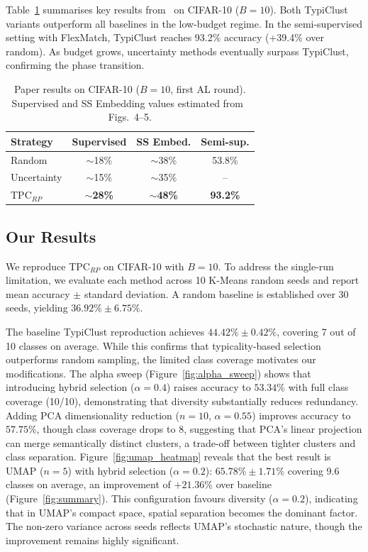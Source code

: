 \documentclass[10pt, twocolumn]{article}
\begin{document}
Table~\ref{tab:paper} summarises key results from~\cite{hacohen2022active} on CIFAR-10 ($B=10$). Both TypiClust variants outperform all baselines in the low-budget regime. In the semi-supervised setting with FlexMatch, TypiClust reaches 93.2\% accuracy (+39.4\% over random). As budget grows, uncertainty methods eventually surpass TypiClust, confirming the phase transition.

\begin{table}[h!]
    \centering\small
    \begin{tabular}{lccc}
        \toprule
        Strategy & Supervised & SS Embed. & Semi-sup. \\
        \midrule
        Random     & $\sim$18\% & $\sim$38\% & 53.8\% \\
        Uncertainty & $\sim$15\% & $\sim$35\% & -- \\
        TPC$_{RP}$ & $\sim$\textbf{28\%} & $\sim$\textbf{48\%} & \textbf{93.2\%} \\
        \bottomrule
    \end{tabular}
    \caption{Paper results on CIFAR-10 ($B=10$, first AL round). Supervised and SS Embedding values estimated from~\cite{hacohen2022active} Figs.\ 4--5.}
    \label{tab:paper}
\end{table}

\subsection{Our Results}

We reproduce TPC$_{RP}$ on CIFAR-10 with $B = 10$. To address the single-run limitation, we evaluate each method across 10 K-Means random seeds and report mean accuracy $\pm$ standard deviation. A random baseline is established over 30 seeds, yielding $36.92\% \pm 6.75\%$.

The baseline TypiClust reproduction achieves $44.42\% \pm 0.42\%$, covering 7 out of 10 classes on average. While this confirms that typicality-based selection outperforms random sampling, the limited class coverage motivates our modifications. The alpha sweep (Figure~\ref{fig:alpha_sweep}) shows that introducing hybrid selection ($\alpha = 0.4$) raises accuracy to $53.34\%$ with full class coverage (10/10), demonstrating that diversity substantially reduces redundancy. Adding PCA dimensionality reduction ($n = 10$, $\alpha = 0.55$) improves accuracy to $57.75\%$, though class coverage drops to 8, suggesting that PCA's linear projection can merge semantically distinct clusters, a trade-off between tighter clusters and class separation. Figure~\ref{fig:umap_heatmap} reveals that the best result is UMAP ($n = 5$) with hybrid selection ($\alpha = 0.2$): $65.78\% \pm 1.71\%$ covering 9.6 classes on average, an improvement of $+21.36\%$ over baseline (Figure~\ref{fig:summary}). This configuration favours diversity ($\alpha = 0.2$), indicating that in UMAP's compact space, spatial separation becomes the dominant factor. The non-zero variance across seeds reflects UMAP's stochastic nature, though the improvement remains highly significant.
\end{document}
